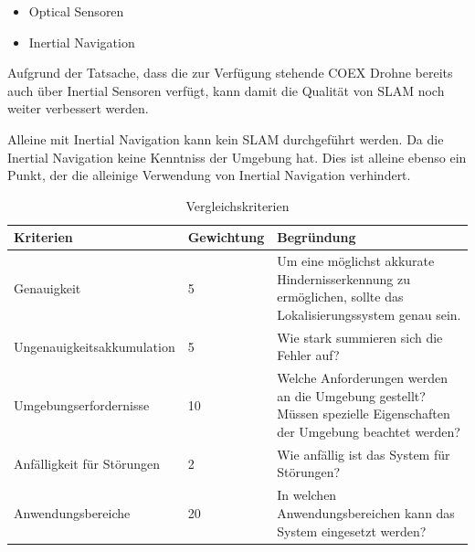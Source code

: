 \begin{itemize}
    \item Optical Sensoren
    \item Inertial Navigation
\end{itemize}

Aufgrund der Tatsache, dass die zur Verfügung stehende COEX Drohne bereits auch über Inertial Sensoren verfügt, kann damit die Qualität von \ac{SLAM} noch weiter verbessert werden.

Alleine mit Inertial Navigation kann kein \ac{SLAM} durchgeführt werden. Da die Inertial Navigation keine Kenntniss der Umgebung hat. Dies ist alleine ebenso ein Punkt, der die alleinige Verwendung von Inertial Navigation verhindert.

\begin{table}[h]
    \centering
    \begin{tabular}{|p{5cm}|p{5cm}|p{5cm}|}
        \hline
        \textbf{Kriterien} & \textbf{Gewichtung} & \textbf{Begründung} \\
        \hline
        Genauigkeit & 5 & Um eine möglichst akkurate Hindernisserkennung zu ermöglichen, sollte das Lokalisierungssystem genau sein. \\
        \hline
        Ungenauigkeitsakkumulation & 5 & Wie stark summieren sich die Fehler auf? \\
        \hline
        Umgebungserfordernisse & 10 & Welche Anforderungen werden an die Umgebung gestellt? Müssen spezielle Eigenschaften der Umgebung beachtet werden? \\
        \hline
        Anfälligkeit für Störungen & 2 & Wie anfällig ist das System für Störungen? \\
        \hline
        Anwendungsbereiche & 20 & In welchen Anwendungsbereichen kann das System eingesetzt werden? \\
        \hline
    \end{tabular}
    \caption{Vergleichskriterien}
    \label{tab:vergleich-kriterien}
\end{table}
